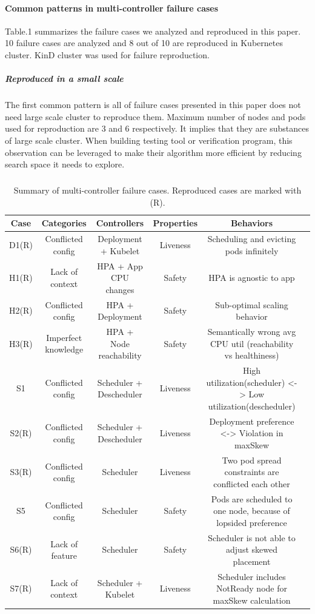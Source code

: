 \paragraph*{Common patterns in multi-controller failure cases}
Table.1 summarizes the failure cases we analyzed and reproduced in this paper. 10 failure cases are analyzed and 8 out of 10 are reproduced in Kubernetes cluster. KinD cluster was used for failure reproduction.

\subparagraph*{Reproduced in a small scale} The first common pattern is all of failure cases presented in this paper does not need large scale cluster to reproduce them. Maximum number of nodes and pods used for reproduction are 3 and 6 respectively. It implies that they are substances of large scale cluster. When building testing tool or verification program, this observation can be leveraged to make their algorithm more efficient by reducing search space it needs to explore.

\subparagraph*{}

\begin{table}[t]
    \centering
    \begin{tabular}{c c c c c c}
    \hline
        Case & Categories & Controllers & Properties & Behaviors  \\ 
        \hline
        D1(R) & Conflicted config & Deployment + Kubelet & Liveness & Scheduling and evicting pods infinitely  \\ 
        H1(R) & Lack of context & HPA + App CPU changes & Safety & HPA is agnostic to app  \\ 
        H2(R) & Conflicted config & HPA + Deployment & Safety & Sub-optimal scaling behavior  \\ 
        H3(R) & Imperfect knowledge & HPA + Node reachability & Safety & Semantically wrong avg CPU util (reachability vs healthiness)  \\ 
        S1 & Conflicted config & Scheduler + Descheduler & Liveness & High utilization(scheduler) <-> Low utilization(descheduler) \\ 
        S2(R) & Conflicted config & Scheduler + Descheduler & Liveness & Deployment preference <-> Violation in maxSkew \\ 
        S3(R) & Conflicted config & Scheduler & Liveness & Two pod spread constraints are conflicted each other  \\ 
        S5 & Conflicted config & Scheduler & Safety & Pods are scheduled to one node, because of lopsided preference  \\ 
        S6(R) & Lack of feature & Scheduler & Safety & Scheduler is not able to adjust skewed placement  \\ 
        S7(R) & Lack of context & Scheduler + Kubelet & Liveness & Scheduler includes NotReady node for maxSkew calculation  \\ 
        \hline
    \end{tabular}
    \caption{Summary of multi-controller failure cases. Reproduced cases are marked with (R).}
    \label{table:summary}
\end{table}

